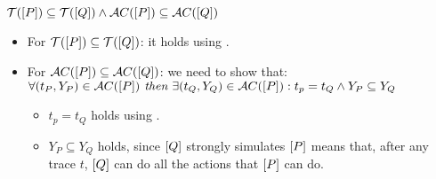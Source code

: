 \begin{prf}
$\traces[P]\subseteq\traces[Q] \wedge \accepatances[P]\subseteq\accepatances[Q]$
\begin{itemize}
\item For $\traces[P]\subseteq\traces[Q]$: it holds using .
\item For $\accepatances[P]\subseteq\accepatances[Q]$: we need to show that:\\$\forall (t_P, Y_P) \in \accepatances[P] \textit{ then } \exists (t_Q, Y_Q) \in \accepatances[P]: t_p = t_Q \wedge Y_P \subseteq Y_Q$
\begin{itemize}
\item $t_p = t_Q$ holds using .
\item $Y_P \subseteq Y_Q$ holds, since $\left[Q\right]$ strongly simulates $\left[P\right]$ means that, after any trace $t$, $\left[Q\right]$ can do all the actions that $\left[P\right]$ can do.
\end{itemize}
\end{itemize}
\end{prf}